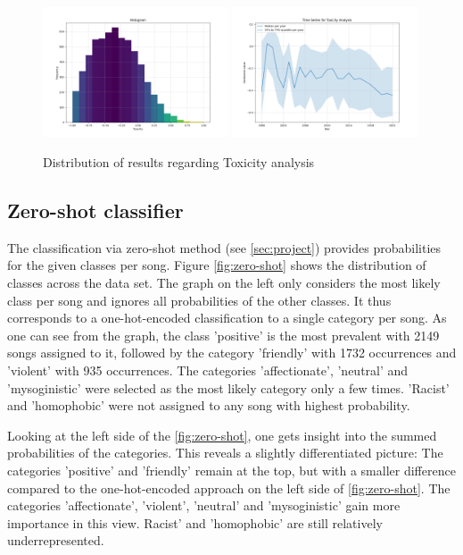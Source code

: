 \begin{figure}[!htb]
    \centering
    \includegraphics[width=0.49\textwidth]{figures/toxicity_histogram.png}
    \includegraphics[width=0.49\textwidth]{figures/time_series_toxicity.png}
    \caption{Distribution of results regarding Toxicity analysis}
    \label{fig:toxicity}
\end{figure}

\subsection*{Zero-shot classifier}

The classification via zero-shot method (see \autoref{sec:project}) provides probabilities for the given classes per song. Figure \autoref{fig:zero-shot} shows the distribution of classes across the data set. The graph on the left only considers the most likely class per song and ignores all probabilities of the other classes. It thus corresponds to a one-hot-encoded classification to a single category per song. As one can see from the graph, the class 'positive' is the most prevalent with 2149 songs assigned to it, followed by the category 'friendly' with 1732 occurrences and 'violent' with 935 occurrences. The categories 'affectionate', 'neutral' and 'mysoginistic' were selected as the most likely category only a few times. 'Racist' and 'homophobic' were not assigned to any song with highest probability.

Looking at the left side of the \autoref{fig:zero-shot}, one gets insight into the summed probabilities of the categories. This reveals a slightly differentiated picture: The categories 'positive' and 'friendly' remain at the top, but with a smaller difference compared to the one-hot-encoded approach on the left side of \autoref{fig:zero-shot}. The categories 'affectionate', 'violent', 'neutral' and 'mysoginistic' gain more importance in this view. Racist' and 'homophobic' are still relatively underrepresented.


